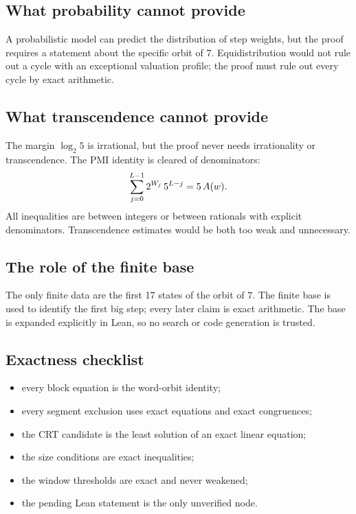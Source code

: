 \subsection{What probability cannot provide}

A probabilistic model can predict the distribution of step weights,
but the proof requires a statement about the specific orbit of $7$.
Equidistribution would not rule out a cycle with an exceptional
valuation profile; the proof must rule out every cycle by exact
arithmetic.

\subsection{What transcendence cannot provide}

The margin $\log_2 5$ is irrational, but the proof never needs
irrationality or transcendence.  The PMI identity is cleared of
denominators:
\begin{equation*}
  \sum_{j=0}^{L-1}2^{W_j}\,5^{L-j}=5\,A(w).
\end{equation*}
All inequalities are between integers or between rationals with
explicit denominators.  Transcendence estimates would be both too weak
and unnecessary.

\subsection{The role of the finite base}

The only finite data are the first 17 states of the orbit of $7$.  The
finite base is used to identify the first big step; every later claim
is exact arithmetic.  The base is expanded explicitly in Lean, so no
search or code generation is trusted.

\subsection{Exactness checklist}

\begin{itemize}[leftmargin=*]
\item every block equation is the word-orbit identity;
\item every segment exclusion uses exact equations and exact
  congruences;
\item the CRT candidate is the least solution of an exact linear
  equation;
\item the size conditions are exact inequalities;
\item the window thresholds are exact and never weakened;
\item the pending Lean statement is the only unverified node.
\end{itemize}

